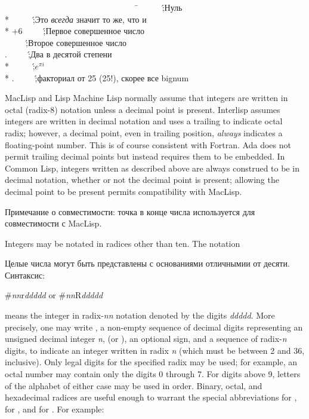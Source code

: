 \begin{lisp}
~~~~~~~~~~~~~~~~~~~~~~~~~~~~~~~~\=\kill
{}~~~~~\';\textrm{Нуль} \\*
~~~~~\';\textrm{Это \emph{всегда} значит то же, что и } \\*
\>+6~~~~~\';\textrm{Первое совершенное число} \\
~~~~~\';\textrm{Второе совершенное число} \\
.~~~~~\';\textrm{Два в десятой степени} \\*
~~~~~\';\textrm{$e^{\pi i}$} \\*
.~~~~~\';\textrm{факториал от 25 (25!),
скорее все bignum}
\end{lisp}

\beforenoterule
\begin{incompatibility}
MacLisp and Lisp Machine Lisp normally assume that integers
are written in octal (radix-8) notation unless a decimal
point is present.
Interlisp assumes integers are written in decimal notation and uses a
trailing  to indicate octal radix; however, a decimal point,
even in trailing position, \emph{always} indicates a floating-point number.
This is of course consistent with Fortran.  Ada does not permit
trailing decimal points but instead requires them to be embedded.
In Common Lisp, integers written as described
above are always construed to be
in decimal notation, whether or not the decimal point is present;
allowing the decimal point to be present permits compatibility with
MacLisp.

Примечание о совместимости: точка в конце числа используется для
совместимости с MacLisp.
\end{incompatibility}
\afternoterule


Integers may be notated in radices other than ten.
The notation

Целые числа могут быть представлены с основаниями отличнымии от
десяти. Синтаксис: 
\begin{lisp}
\#\emph{nn}r\emph{ddddd}     \textrm{or}     \#\emph{nn}R\emph{ddddd}
\end{lisp}
means the integer in radix-\emph{nn} notation denoted by the digits
\emph{ddddd}.  More precisely, one may write \cd{\#}, a non-empty sequence
of decimal digits representing an unsigned decimal integer \emph{n},
 (or ), an optional sign, and a sequence of radix-\emph{n}
digits, to indicate an integer written in radix \emph{n} (which must be
between 2 and 36, inclusive).  Only legal digits
for the specified radix may be used; for example, an octal number may
contain only the digits 0 through 7.  For digits above 9,
letters of the alphabet of either
case may be used in order.  Binary, octal, and
hexadecimal radices are useful enough to warrant the special
abbreviations  for ,  for , and
 for .
For example:

